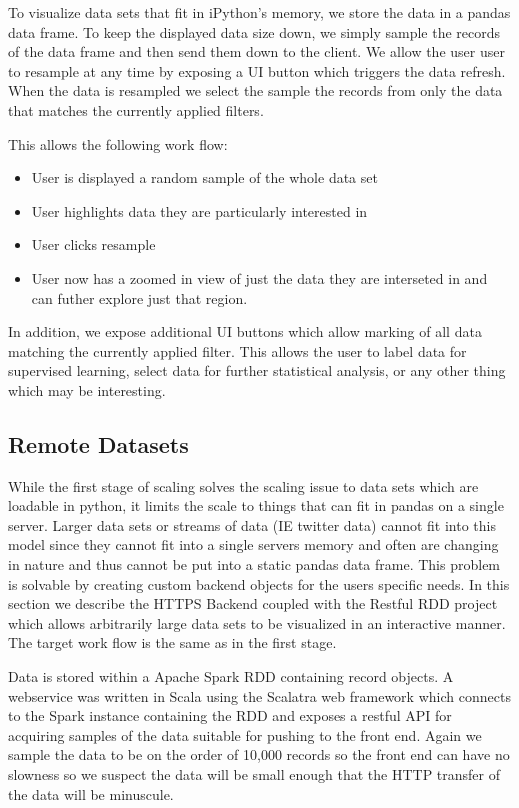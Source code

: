\documentclass[letter,twocolumn]{article}
\begin{document}
To visualize data sets that fit in iPython's memory, we store the data in a pandas data frame.
To keep the displayed data size down, we simply sample the records of the data frame and then send them down to the client.
We allow the user user to resample at any time by exposing a UI button which triggers the data refresh.
When the data is resampled we select the sample the records from only the data that matches the currently applied filters.

This allows the following work flow:
\begin{itemize}
	\item User is displayed a random sample of the whole data set
	\item User highlights data they are particularly interested in
	\item User clicks resample
	\item User now has a zoomed in view of just the data they are interseted in and can futher explore just that region.
\end{itemize}

In addition, we expose additional UI buttons which allow marking of all data matching the currently applied filter.
This allows the user to label data for supervised learning, select data for further statistical analysis, or any other thing which may be interesting.

\subsection{Remote Datasets}\label{sec:big_data_remote}

While the first stage of scaling solves the scaling issue to data sets which are loadable in python, it limits the scale to things that can fit in pandas on a single server.
Larger data sets or streams of data (IE twitter data) cannot fit into this model since they cannot fit into a single servers memory and often are changing in nature and thus cannot be put into a static pandas data frame.
This problem is solvable by creating custom backend objects for the users specific needs.
In this section we describe the HTTPS Backend coupled with the Restful RDD project which allows arbitrarily large data sets to be visualized in an interactive manner.
The target work flow is the same as in the first stage.

Data is stored within a Apache Spark RDD containing record objects.  A webservice was written in Scala using the Scalatra web framework which connects to the Spark instance containing the RDD and exposes a restful API for acquiring samples of the data suitable for pushing to the front end.  Again we sample the data to be on the order of 10,000 records so the front end can have no slowness so we suspect the data will be small enough that the HTTP transfer of the data will be minuscule.
\end{document}
